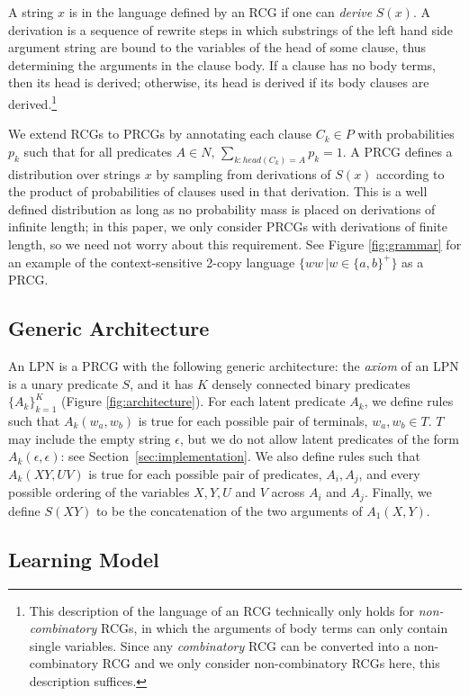 \documentclass{article} %
\begin{document}
A string $x$ is in the language defined by an RCG if one can
\emph{derive} $S(x)$. A derivation is a sequence of rewrite steps in
which substrings of the left hand side argument string are bound to
the variables of the head of some clause, thus determining the
arguments in the clause body. If a clause has no body terms, then its
head is derived; otherwise, its head is derived if its body clauses
are derived.\footnote{This description of the language of an RCG
  technically only holds for \emph{non-combinatory} RCGs, in which the
  arguments of body terms can only contain single variables. Since any
  \emph{combinatory} RCG can be converted into a non-combinatory RCG
  and we only consider non-combinatory RCGs here, this description
  suffices.}

We extend RCGs to PRCGs by annotating each clause $C_k \in P$ with
probabilities $p_k$ such that for all predicates ${A \in N, \,
  \sum_{k:head(C_k)=A} p_k = 1}$. A PRCG defines a distribution over
strings $x$ by sampling from derivations of $S(x)$ according to the
product of probabilities of clauses used in that derivation. This is a
well defined distribution as long as no probability mass is placed on
derivations of infinite length; in this paper, we only consider PRCGs
with derivations of finite length, so we need not worry about this
requirement. See Figure \ref{fig:grammar} for an example of the context-sensitive 2-copy language $\{ww\,|w \in \{a,b\}^+\}$ as a PRCG.

\subsection{Generic Architecture}

An LPN is a PRCG with the following generic architecture: the
\emph{axiom} of an LPN is a unary predicate $S$, and it has $K$
densely connected binary predicates $\{A_k\}_{k=1}^K$ (Figure
\ref{fig:architecture}). For each latent predicate $A_k$, we define
rules such that $A_k(w_a,w_b)$ is true for each possible pair of
terminals, $w_a,w_b \in T$. $T$ may include the empty string $\epsilon$, but we
do not allow latent predicates of the form $A_k(\epsilon, \epsilon)$:
see Section~\ref{sec:implementation}. We also define rules such that
$A_k(XY,UV)$ is true for each possible pair of predicates, $A_i,A_j$,
and every possible ordering of the variables $X,Y,U$ and $V$ across
$A_i$ and $A_j$. Finally, we define $S(XY)$ to be the concatenation of
the two arguments of $A_1(X,Y)$.

\subsection{Learning Model}
\end{document}
